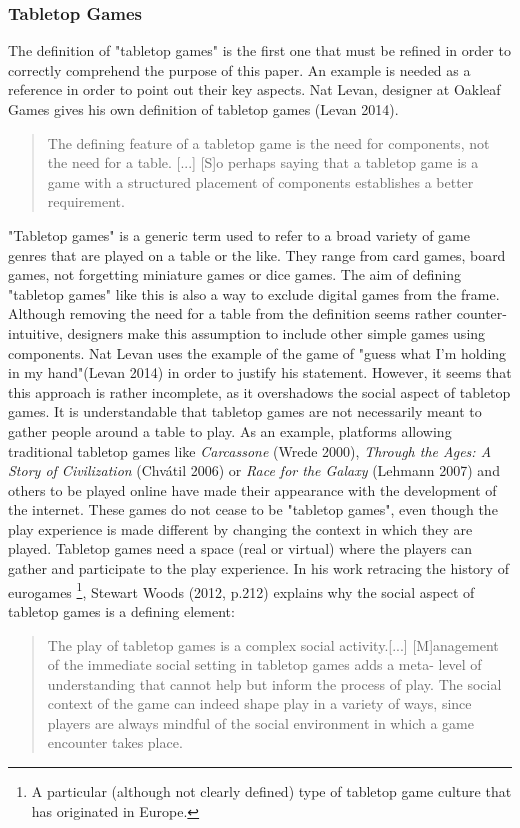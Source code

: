 \subsubsection{Tabletop Games}
The definition of "tabletop games" is the first one that must be refined in order to correctly comprehend the purpose of this paper. An example is needed as a reference in order to point out their key aspects. Nat Levan, designer at Oakleaf Games gives his own definition of tabletop games (Levan 2014).
\begin{quotation}
The defining feature of a tabletop game is the need for components, not the need for a table. [...] [S]o perhaps saying that a tabletop game is a game with a structured placement of components establishes a better requirement.
\end{quotation} 
"Tabletop games" is a generic term used to refer to a broad variety of game genres that are played on a table or the like. They range from card games, board games, not forgetting miniature games or dice games. The aim of defining "tabletop games" like this is also a way to exclude digital games from the frame. Although removing the need for a table from the definition seems rather counter-intuitive, designers make this assumption to include other simple games using components. Nat Levan uses the example of the game of "guess what I’m holding in my hand"(Levan 2014) in order to justify his statement. However, it seems that this approach is rather incomplete, as it overshadows the social aspect of tabletop games. It is understandable that tabletop games are not necessarily meant to gather people around a table to play. As an example, platforms allowing traditional tabletop games like \textit{Carcassone} (Wrede 2000), \textit{Through the Ages: A Story of Civilization} (Chvátil 2006) or \textit{Race for the Galaxy} (Lehmann 2007) and others to be played online have made their appearance with the development of the internet.  These games do not cease to be "tabletop games", even though the play experience is made different by changing the context in which they are played. Tabletop games need a space (real or virtual) where the players can gather and participate to the play experience. In his work retracing the history of eurogames \footnote{A particular (although not clearly defined) type of tabletop game culture that has originated in Europe.}, Stewart Woods (2012, p.212) explains why the social aspect of tabletop games is a defining element:
\begin{quotation}
The play of tabletop games is a complex social activity.[...] [M]anagement of the immediate social setting in tabletop games adds a meta- level of understanding that cannot help but inform the process of play. The social context of the game can indeed shape play in a variety of ways, since players are always mindful of the social environment in which a game encounter takes place.
\end{quotation}
